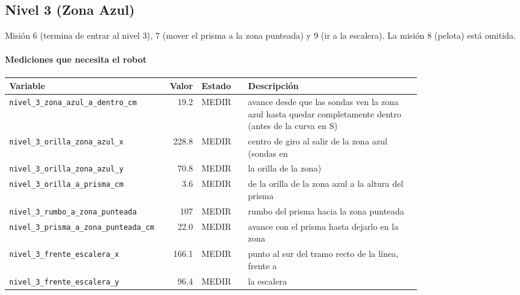 \subsection{Nivel 3 (Zona Azul)}
Misión 6 (termina de entrar al nivel 3), 7 (mover el prisma a la zona punteada) y 9 (ir a la escalera). La misión 8 (pelota) está omitida.

\paragraph{Mediciones que necesita el robot}
\begin{longtable}{@{}p{0.36\linewidth}rlp{0.42\linewidth}@{}}\toprule
\textbf{Variable} & \textbf{Valor} & \textbf{Estado} & \textbf{Descripci\'on} \\\midrule\endhead
\texttt{nivel\_\allowbreak{}3\_\allowbreak{}zona\_\allowbreak{}azul\_\allowbreak{}a\_\allowbreak{}dentro\_\allowbreak{}cm} & 19.2 & MEDIR & avance desde que las sondas ven la zona azul hasta quedar completamente dentro (antes de la curva en S) \\
\texttt{nivel\_\allowbreak{}3\_\allowbreak{}orilla\_\allowbreak{}zona\_\allowbreak{}azul\_\allowbreak{}x} & 228.8 & MEDIR & centro de giro al salir de la zona azul (sondas en \\
\texttt{nivel\_\allowbreak{}3\_\allowbreak{}orilla\_\allowbreak{}zona\_\allowbreak{}azul\_\allowbreak{}y} & 70.8 & MEDIR & la orilla de la zona) \\
\texttt{nivel\_\allowbreak{}3\_\allowbreak{}orilla\_\allowbreak{}a\_\allowbreak{}prisma\_\allowbreak{}cm} & 3.6 & MEDIR & de la orilla de la zona azul a la altura del prisma \\
\texttt{nivel\_\allowbreak{}3\_\allowbreak{}rumbo\_\allowbreak{}a\_\allowbreak{}zona\_\allowbreak{}punteada} & 107 & MEDIR & rumbo del prisma hacia la zona punteada \\
\texttt{nivel\_\allowbreak{}3\_\allowbreak{}prisma\_\allowbreak{}a\_\allowbreak{}zona\_\allowbreak{}punteada\_\allowbreak{}cm} & 22.0 & MEDIR & avance con el prisma hasta dejarlo en la zona \\
\texttt{nivel\_\allowbreak{}3\_\allowbreak{}frente\_\allowbreak{}escalera\_\allowbreak{}x} & 166.1 & MEDIR & punto al sur del tramo recto de la línea, frente a \\
\texttt{nivel\_\allowbreak{}3\_\allowbreak{}frente\_\allowbreak{}escalera\_\allowbreak{}y} & 96.4 & MEDIR & la escalera \\
\bottomrule\end{longtable}
